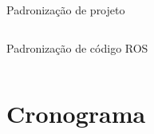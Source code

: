 \documentclass{if-beamer}
\begin{document}
\begin{frame}{Padronização de projeto}
\begin{columns}
\begin{column}{0.45\textwidth}
\begin{block}{Padronização de código ROS}
\begin{itemize}
				\end{itemize}
				
			\end{block}
			
		\end{column}
		
	\end{columns}
	
	\pause

	\vspace{5mm}

	
\end{frame}


\section{Cronograma}
\end{document}
